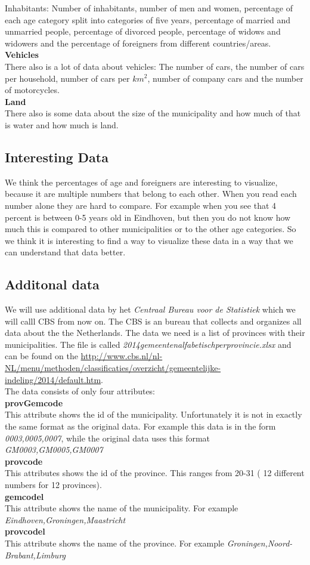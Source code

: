 Inhabitants: Number of inhabitants, number of men and women, percentage of each age category split into categories of five years, percentage of married and unmarried people, percentage of divorced people, percentage of widows and widowers and the percentage of foreigners from different countries/areas. \\
 \textbf{Vehicles} \\
 There also is a lot of data about vehicles: The number of cars, the number of cars per household, number of cars per $km^{2}$, number of company cars and the number of motorcycles. \\
  \textbf{Land} \\
There also is some data about the size of the municipality and how much of that is water and how much is land. \\
\subsection{Interesting Data}
We think the percentages of age and foreigners are interesting to visualize, because it are multiple numbers that belong to each other. When you read each number alone they are hard to compare. For example when you see that 4 percent is between 0-5 years old in Eindhoven, but then you do not know how much this is compared to other municipalities  or to the other age categories. So we think it is interesting to find a way to visualize these data in a way that we can understand that data better. 
\subsection{Additonal data}
We will use additional data by het \emph{Centraal Bureau voor de Statistiek} which we will calll CBS from now on. The CBS is an bureau that collects and organizes all data about the the Netherlands. The data we need is a list of provinces with their municipalities. The file is called \emph{2014gemeentenalfabetischperprovincie.xlsx} and can be found on the  \url{ http://www.cbs.nl/nl-NL/menu/methoden/classificaties/overzicht/gemeentelijke-indeling/2014/default.htm}.\\
The data consists of only four attributes:\\
\textbf{provGemcode} \\
This attribute shows the id of the municipality. Unfortunately it is not in exactly the same format as the original data. For example this data is in the form \emph{0003,0005,0007}, while the original data uses this format \emph{GM0003,GM0005,GM0007}\\
\textbf{provcode} \\
This attributes shows the id of the province. This ranges from 20-31 ( 12 different numbers for 12 provinces).\\
\textbf{gemcodel} \\
This attribute shows the name of the municipality. For example \emph{Eindhoven,Groningen,Maastricht} \\
\textbf{provcodel} \\
This attribute shows the name of the province. For example \emph{Groningen,Noord-Brabant,Limburg} \\ 
